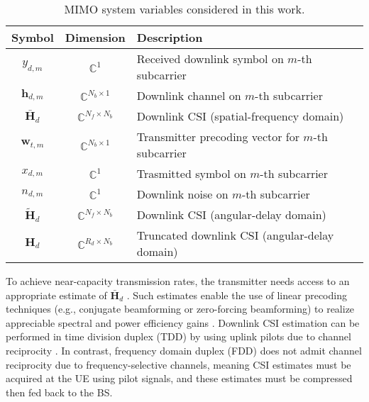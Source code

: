 \begin{table}[]
\renewcommand{\arraystretch}{1.25}
\centering
\caption{MIMO system variables considered in this work.}
\label{tab:mimo-params}
\begin{tabular}{c|c|l}
\toprule
\textbf{Symbol}   	  	  & \textbf{Dimension}            & \textbf{Description} \\ \midrule
$y_{d,m}$ 		  	  	  & $\mathbb{C}^{1}$ 			  & Received downlink symbol on $m$-th subcarrier  \\ \hline
$\mathbf h_{d,m}$ 	  	  & $\mathbb{C}^{N_b \times 1}$   & Downlink channel on $m$-th subcarrier  \\ \hline
$\bar{\mathbf H}_{d}$ 	  & $\mathbb{C}^{N_f \times N_b}$ & Downlink CSI (spatial-frequency domain)  \\ \hline
$\mathbf w_{t,m}$ 	  	  & $\mathbb{C}^{N_b \times 1}$   & Transmitter precoding vector for $m$-th subcarrier  \\ \hline
$x_{d,m}$ 		  	  	  & $\mathbb{C}^{1}$ 			  & Trasmitted symbol on $m$-th subcarrier  \\ \hline
$n_{d,m}$ 		  	  	  & $\mathbb{C}^{1}$ 			  & Downlink noise on $m$-th subcarrier  \\ \hline
$\tilde{\mathbf H}_{d}$   & $\mathbb{C}^{N_f \times N_b}$ & Downlink CSI (angular-delay domain)  \\ \hline
$\mathbf H_{d}$   		  & $\mathbb{C}^{R_d \times N_b}$ & Truncated downlink CSI (angular-delay domain)  \\ \hline
\end{tabular}
\end{table}
To achieve near-capacity transmission rates, the transmitter needs access to an appropriate estimate of $\bar{\mathbf H}_d$ \cite{ref:goldsmith2003capacity}. Such estimates enable the use of linear precoding techniques (e.g., conjugate beamforming or zero-forcing beamforming) to realize appreciable spectral and power efficiency gains \cite{ref:yang2013performance}. Downlink CSI estimation can be performed in time division duplex (TDD) by using uplink pilots due to channel reciprocity \cite{ref:Kaltenberger2010relative,ref:mi2017massive,ref:Gao2010utilization}. In contrast, frequency domain duplex (FDD) does not admit channel reciprocity due to frequency-selective channels, meaning CSI estimates must be acquired at the UE using pilot signals, and these estimates must be compressed then fed back to the BS.

